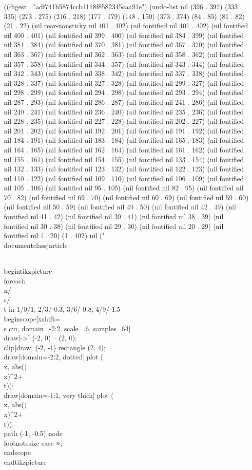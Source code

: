 ((digest . "adf741b5874ccb1118f8582345caa91e") (undo-list nil (396 . 397) (333 . 335) (273 . 275) (216 . 218) (177 . 179) (148 . 150) (373 . 374) (84 . 85) (81 . 82) (21 . 22) (nil rear-nonsticky nil 401 . 402) (nil fontified nil 401 . 402) (nil fontified nil 400 . 401) (nil fontified nil 399 . 400) (nil fontified nil 384 . 399) (nil fontified nil 381 . 384) (nil fontified nil 370 . 381) (nil fontified nil 367 . 370) (nil fontified nil 363 . 367) (nil fontified nil 362 . 363) (nil fontified nil 358 . 362) (nil fontified nil 357 . 358) (nil fontified nil 344 . 357) (nil fontified nil 343 . 344) (nil fontified nil 342 . 343) (nil fontified nil 338 . 342) (nil fontified nil 337 . 338) (nil fontified nil 328 . 337) (nil fontified nil 327 . 328) (nil fontified nil 299 . 327) (nil fontified nil 298 . 299) (nil fontified nil 294 . 298) (nil fontified nil 293 . 294) (nil fontified nil 287 . 293) (nil fontified nil 286 . 287) (nil fontified nil 241 . 286) (nil fontified nil 240 . 241) (nil fontified nil 236 . 240) (nil fontified nil 235 . 236) (nil fontified nil 228 . 235) (nil fontified nil 227 . 228) (nil fontified nil 202 . 227) (nil fontified nil 201 . 202) (nil fontified nil 192 . 201) (nil fontified nil 191 . 192) (nil fontified nil 184 . 191) (nil fontified nil 183 . 184) (nil fontified nil 165 . 183) (nil fontified nil 164 . 165) (nil fontified nil 162 . 164) (nil fontified nil 161 . 162) (nil fontified nil 155 . 161) (nil fontified nil 154 . 155) (nil fontified nil 133 . 154) (nil fontified nil 132 . 133) (nil fontified nil 123 . 132) (nil fontified nil 122 . 123) (nil fontified nil 110 . 122) (nil fontified nil 109 . 110) (nil fontified nil 106 . 109) (nil fontified nil 105 . 106) (nil fontified nil 95 . 105) (nil fontified nil 82 . 95) (nil fontified nil 70 . 82) (nil fontified nil 69 . 70) (nil fontified nil 60 . 69) (nil fontified nil 59 . 60) (nil fontified nil 50 . 59) (nil fontified nil 49 . 50) (nil fontified nil 42 . 49) (nil fontified nil 41 . 42) (nil fontified nil 39 . 41) (nil fontified nil 38 . 39) (nil fontified nil 30 . 38) (nil fontified nil 29 . 30) (nil fontified nil 20 . 29) (nil fontified nil 1 . 20) (1 . 402) nil ("\\documentclass{jarticle}
\begin{document}
 

\\begin{tikzpicture}
 \\foreach \\n/\\s/\\t in {1/0/1, 2/3/-0.3, 3/6/-0.8, 4/9/-1.5}
 {
 \\begin{scope}[xshift=\\s cm, domain=-2:2, scale=.6, samples=64]
  \\draw[->] (-2, 0) -- (2, 0);
  \\clip[draw] (-2, -1) rectangle (2, 4);
  \\draw[domain=-2:2, dotted] plot (\\x, {abs((\\x)^{2}+\\t)});
  \\draw[domain=-1:1, very thick] plot (\\x, {abs((\\x)^{2}+\\t)});
  \\path (-1, -0.5) node {\\footnotesize case $\\n$};
 \\end{scope}
 }
\\end{tikzpicture}
\end{document}
